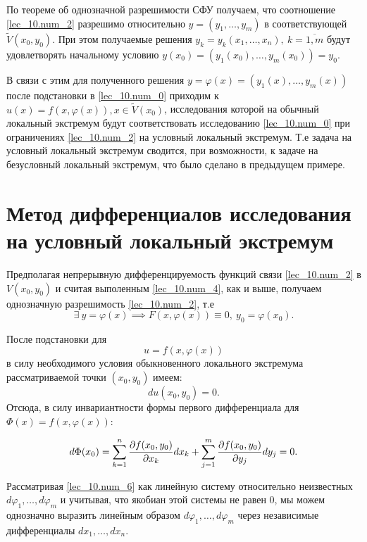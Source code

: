 \documentclass[../../main.tex]{subfiles}
\begin{document}
По теореме об однозначной разрешимости СФУ получаем, что 
соотношение \eqref{lec_10.num_2} разрешимо относительно $y = \left( 
y_1, \ldots, y_m \right)$ в соответствующей $\widetilde{V} (x_0, y_0)$.
При этом получаемые решения $y_k = y_k \left( x_1, \ldots, x_n 
\right),\ k = \overline{1, m}$ будут удовлетворять начальному условию
$y(x_0) = \left( y_1(x_0), \ldots, y_m(x_0) \right) = y_0$.

В связи с этим для полученного решения $y = \varphi(x) = \left( 
y_1(x), \ldots, y_m(x) \right)$ после подстановки в \eqref{lec_10.num_0} 
приходим к $u(x) = f( x, \varphi(x) ), x \in \widetilde{V}(x_0)$, 
исследования которой на обычный локальный экстремум будут 
соответствовать исследованию \eqref{lec_10.num_0} 
при ограничениях \eqref{lec_10.num_2} на условный локальный экстремум.
Т.е задача на условный локальный экстремум сводится, при возможности, 
к задаче на безусловный 
локальный экстремум, что было сделано в предыдущем примере.

\section{Метод дифференциалов исследования на условный локальный экстремум}

Предполагая непрерывную дифференцируемость функций связи \eqref{lec_10.num_2} 
в $V(x_0, y_0)$ и считая выполенным \eqref{lec_10.num_4}, как и выше,
получаем однозначную разрешимость \eqref{lec_10.num_2}, т.е
\[\exists\:y = \varphi(x) \implies F( x, \varphi(x)) \equiv 0,\ 
y_0 = \varphi(x_0).\]

После подстановки для
\begin{equation} \label{lec_10.num_5}
	u = f( x, \varphi(x) )
\end{equation}
в силу необходимого условия обыкновенного локального экстремума 
рассматриваемой точки $(x_0, y_0)$ имеем:
\[ du(x_0, y_0) = 0. \]
Отсюда, в силу инвариантности формы первого дифференциала для 
$\Phi(x) = f( x, \varphi(x) )$:

\begin{equation} \label{lec_10.num_6}
	d\Phi(x_0) = \sum_{k = 1}^{n} \frac{\partial  f(x_0, y_0) }{\partial x_k} 
	dx_k + \sum_{j = 1}^{m} \frac{\partial  f(x_0, y_0) }{\partial y_j} dy_j = 0.
\end{equation}

Рассматривая \eqref{lec_10.num_6} как линейную систему относительно неизвестных
$d\varphi_1, \ldots, d\varphi_m$ и учитывая, что якобиан 
этой системы не равен $0$,
мы можем однозначно выразить линейным образом $d\varphi_1, \dots, d\varphi_m$
через независимые дифференциалы $dx_1, \ldots, dx_n$.
\end{document}
